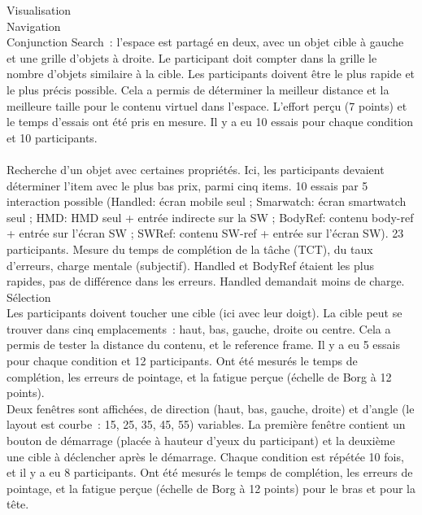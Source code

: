         Visualisation \\
        Navigation \\
        	Conjunction Search~: l'espace est partagé en deux, avec un objet cible à gauche et une grille d'objets à droite. Le participant doit compter dans la grille le nombre d'objets similaire à la cible. Les participants doivent être le plus rapide et le plus précis possible. Cela a permis de déterminer la meilleur distance et la meilleure taille pour le contenu virtuel dans l'espace. L'effort perçu (7 points) et le temps d'essais ont été pris en mesure. Il y a eu 10 essais pour chaque condition et 10 participants. \cite{EnsFinneganIrani2014} \\
        	\cite{RashidNacentaQuigley2012} \\
        	Recherche d'un objet avec certaines propriétés. Ici, les participants devaient déterminer l'item avec le plus bas prix, parmi cinq items. 10 essais par 5 interaction possible (Handled: écran mobile seul ; Smarwatch: écran smartwatch seul ; HMD: HMD seul + entrée indirecte sur la SW ; BodyRef: contenu body-ref + entrée sur l'écran SW ; SWRef: contenu SW-ref + entrée sur l'écran SW). 23 participants. Mesure du temps de complétion de la tâche (TCT), du taux d'erreurs, charge mentale (subjectif). Handled et BodyRef étaient les plus rapides, pas de différence dans les erreurs. Handled demandait moins de charge. \cite{GrubertHeinischQuigleyEtAl2015} \\
        Sélection \\
        	Les participants doivent toucher une cible (ici avec leur doigt). La cible peut se trouver dans cinq emplacements~: haut, bas, gauche, droite ou centre. Cela a permis de tester la distance du contenu, et le reference frame. Il y a eu 5 essais pour chaque condition et 12 participants. Ont été mesurés le temps de complétion, les erreurs de pointage, et la fatigue perçue (échelle de Borg à 12 points). \cite{EnsFinneganIrani2014} \\
        	Deux fenêtres sont affichées, de direction (haut, bas, gauche, droite) et d'angle (le layout est courbe~: 15\textdegree, 25\textdegree, 35\textdegree, 45\textdegree, 55\textdegree) variables. La première fenêtre contient un bouton de démarrage (placée à hauteur d'yeux du participant) et la deuxième une cible à déclencher après le démarrage. Chaque condition est répétée 10 fois, et il y a eu 8 participants. Ont été mesurés le temps de complétion, les erreurs de pointage, et la fatigue perçue (échelle de Borg à 12 points) pour le bras et pour la tête. \cite{EnsFinneganIrani2014} \\
